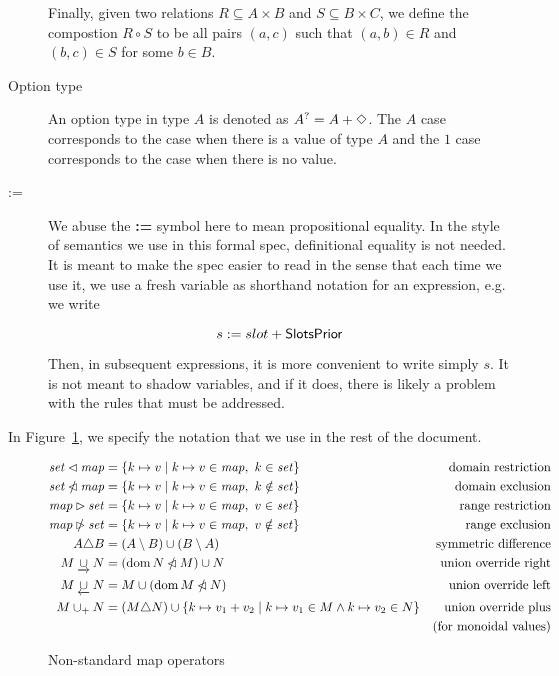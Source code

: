\begin{description}
    Finally, given two relations $R\subseteq A\times B$ and $S\subseteq B\times C$,
    we define the compostion $R\circ S$ to be all pairs $(a, c)$ such that
    $(a, b)\in R$ and $(b, c)\in S$ for some $b\in B$.
  \item[Option type] An option type in type $A$ is denoted as $A^? = A + \Diamond$. The
    $A$ case corresponds to the case when there is a value of type $A$ and the $1$
    case corresponds to the case when there is no value.
  \item[:=] We abuse the \textbf{:=} symbol here to mean propositional equality. In the
  style of semantics we use in this formal spec, definitional equality is not needed.
  It is meant to make the spec easier to read in the sense that each time we use it,
  we use a fresh variable as shorthand notation for an expression, e.g. we write

  \[s := slot + \mathsf{SlotsPrior}\]

  Then, in subsequent expressions, it is more convenient to write simply $s$.
  It is not meant to shadow variables, and if it does, there is likely a problem with the
  rules that must be addressed.
\end{description}


In Figure~\ref{fig:notation:nonstandard}, we specify the notation that we use in
the rest of the document.

\begin{figure}[htb]
  \begin{align*}
    \mathit{set} \lhd \mathit{map}
    & = \{ k \mapsto v \mid k \mapsto v \in \mathit{map}, ~ k \in \mathit{set} \}
    & \text{domain restriction}
    \\
    \mathit{set} \mathbin{\slashed{\lhd}} \mathit{map}
    & = \{ k \mapsto v \mid k \mapsto v \in \mathit{map}, ~ k \notin \mathit{set} \}
    & \text{domain exclusion}
    \\
    \mathit{map} \rhd \mathit{set}
    & = \{ k \mapsto v \mid k \mapsto v \in \mathit{map}, ~ v \in \mathit{set} \}
    & \text{range restriction}
    \\
    \mathit{map} \mathbin{\slashed{\rhd}} \mathit{set}
    & = \{ k \mapsto v \mid k \mapsto v \in \mathit{map}, ~ v \notin \mathit{set} \}
    & \text{range exclusion}
    \\
    A \triangle B
    & = (A \setminus B) \cup (B \setminus A)
    & \text{symmetric difference}
    \\
    M \mathbin{\underrightarrow\cup} N
    & = (\operatorname{dom} N \mathbin{\slashed{\lhd}} M)\cup N
    & \text{union override right}
    \\
    M \mathbin{\underleftarrow\cup} N
    & = M \cup (\operatorname{dom} M \mathbin{\slashed{\lhd}} N)
    & \text{union override left}
    \\
    M \mathbin{\cup_{+}} N
    & = (M \triangle N)
    \cup \{k\mapsto v_1+v_2\mid {k\mapsto v_1}\in M \land {k\mapsto v_2}\in N \}
    & \text{union override plus} \\
    & & \text{(for monoidal values)}\\
  \end{align*}
  \caption{Non-standard map operators}
  \label{fig:notation:nonstandard}
\end{figure}

\clearpage
